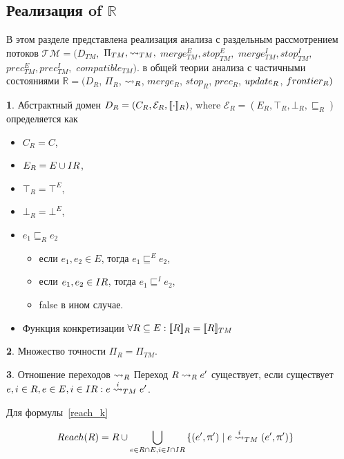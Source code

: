 \subsection{Реализация of $\mathbb{R}$}

В этом разделе представлена реализация анализа с раздельным рассмотрением потоков 
$\mathcal{TM}=(D_{TM},$ $\Pi_{TM}, \leadsto_{TM},$ $merge^E_{TM}, stop^E_{TM},$ $merge^I_{TM}, stop^I_{TM},$ $prec^E_{TM},prec^I_{TM},$ $compatible_{TM})$.
в общей теории анализа с частичными состояниями
$\mathbb{R}=(D_R$, $\Pi_R$, $\leadsto_R$, $merge_R$, $stop_R$, $prec_R$, $update_R$, $frontier_R)$


{\textbf 1.} Абстрактный домен $D_R = (C_R,\mathcal{E}_R,[\![ \cdot ]\!]_R)$, where $\mathcal{E}_R=(E_R,\top_R, \bot_R, \sqsubseteq_R)$ определяется как
\begin{itemize}
\item $C_R = C$,
\item $E_R = E \cup IR$,
\item $\top_R = \top^E$,
\item $\bot_R = \bot^E$,
\item $e_1 \sqsubseteq_R e_2$
\begin{itemize}
\item если $e_1,e_2 \in E$, тогда $e_1 \sqsubseteq^E e_2$,
\item если $e_1,e_2 \in IR$, тогда $e_1 \sqsubseteq^I e_2$,
\item false в ином случае.
\end{itemize}
\item Функция конкретизации 
$\forall R\subseteq E: [\![ R ]\!]_R = [\![ R ]\!]_{TM}$
\end{itemize}

{\textbf 2.} Множество точности $\Pi_R = \Pi_{TM}$.

{\textbf 3.} Отношение переходов $\leadsto_{R}$
Переход $R \leadsto_{R} e'$ существует, если существует $e, i\in R, e\in E, i \in IR: e \stackrel{i}{\leadsto}_{TM} e'$.

Для формулы~\ref{reach_k} 

\begin{equation}
\label{cpa_tm_transfer}
\begin{aligned}
& Reach(R) = R \cup \bigcup_{e \in R \cap E, i \in I \cap IR}{\{(e', \uppi') \mid e \stackrel{i}{\leadsto}_{TM} (e', \uppi')\}}
\end{aligned}
\end{equation}

